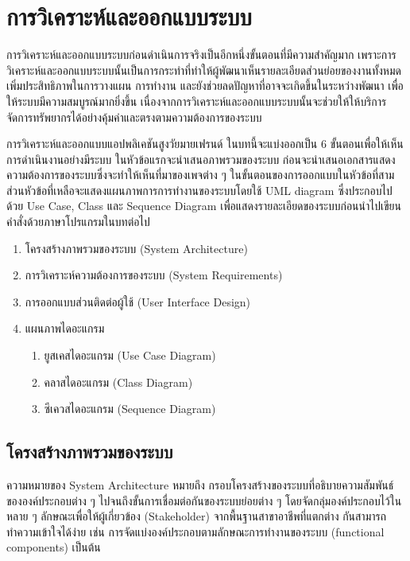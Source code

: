 \chapter{การวิเคราะห์และออกแบบระบบ}

การวิเคราะห์และออกแบบระบบก่อนดำเนินการจริงเป็นอีกหนึ่งขั้นตอนที่มีความสำคัญมาก เพราะการวิเคราะห์และออกแบบระบบนั้นเป็นการกระทำที่ทำให้ผู้พัฒนาเห็นรายละเอียดส่วนย่อยของงานทั้งหมด เพิ่มประสิทธิภาพในการวางแผน การทำงาน และยังช่วยลดปัญหาที่อาจจะเกิดขึ้นในระหว่างพัฒนา เพื่อให้ระบบมีความสมบูรณ์มากยิ่งขึ้น เนื่องจากการวิเคราะห์และออกแบบระบบนั้นจะช่วยให้ให้บริการ จัดการทรัพยากรได้อย่างคุ้มค่าและตรงตามความต้องการของระบบ

การวิเคราะห์และออกแบบแอปพลิเคชันสูงวัยมายเฟรนด์ ในบทนี้จะแบ่งออกเป็น 6 ขั้นตอนเพื่อให้เห็นการดำเนินงานอย่างมีระบบ ในหัวข้อแรกจะนำเสนอภาพรวมของระบบ ก่อนจะนำเสนอเอกสารแสดงความต้องการของระบบซึ่งจะทำให้เห็นที่มาของเพจต่าง ๆ ในขั้นตอนของการออกแบบในหัวข้อที่สาม ส่วนหัวข้อที่เหลือจะแสดงแผนภาพการการทำงานของระบบโดยใช้ UML diagram ซึ่งประกอบไปด้วย Use Case, Class และ Sequence Diagram เพื่อแสดงรายละเอียดของระบบก่อนนำไปเขียนคำสั่งด้วยภาษาโปรแกรมในบทต่อไป

\begin{enumerate}[label=3.\arabic*]
	\item โครงสร้างภาพรวมของระบบ (System Architecture)
	\item การวิเคราะห์ความต้องการของระบบ (System Requirements)
	\item การออกแบบส่วนติดต่อผู้ใช้ (User Interface Design)
	\item แผนภาพไดอะแกรม
	\begin{enumerate}[label=3.3.\arabic*]
		\item ยูสเคสไดอะแกรม (Use Case Diagram)
		\item คลาสไดอะแกรม (Class Diagram)
		\item ซีเควสไดอะแกรม (Sequence Diagram)
	\end{enumerate}	
\end{enumerate}	


\section{โครงสร้างภาพรวมของระบบ}
    ความหมายของ System Architecture \cite{architecture} หมายถึง กรอบโครงสร้างของระบบที่อธิบายความสัมพันธ์ขององค์ประกอบต่าง ๆ ไปจนถึงขั้นการเชื่อมต่อกันของระบบย่อยต่าง ๆ โดยจัดกลุ่มองค์ประกอบไว้ในหลาย ๆ ลักษณะเพื่อให้ผู้เกี่ยวข้อง (Stakeholder) จากพื้นฐานสาขาอาชีพที่แตกต่าง กันสามารถทำความเข้าใจได้ง่าย เช่น การจัดแบ่งองค์ประกอบตามลักษณะการทำงานของระบบ (functional components) เป็นต้น
    
